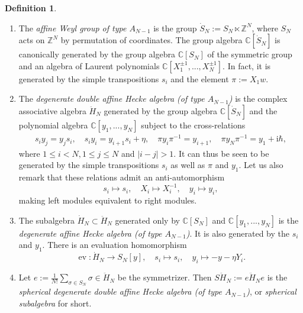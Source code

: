 \documentclass[11pt]{report}
\theoremstyle{definition}
\newtheorem{definition}[theorem]{Definition}
\theoremstyle{remark}
\theoremstyle{remark}
\newcommand{\Z}{\mathbb{Z}}
\newcommand{\C}{\mathbb{C}}
\newcommand{\I}{\mathrm{i}}
\begin{document}
\begin{definition}
\begin{enumerate}[label=(\roman*)]
\item The \emph{affine Weyl group of type $A_{N-1}$} is the group $\dot S_N := S_N \ltimes \Z^N$, where $S_N$ acts on $\Z^N$ by permutation of coordinates. The group algebra $\C[\dot S_N]$ is canonically generated by the group algebra $\C[S_N]$ of the symmetric group and an algebra of Laurent polynomials $\C[X_1^{\pm 1},...,X_N^{\pm 1}]$. In fact, it is generated by the simple transpositions $s_i$ and the element $\pi := X_1 w$.
\item The \emph{degenerate double affine Hecke algebra (of type $A_{N-1}$)} is the complex associative algebra $\ddot H_N$ generated by the group algebra $\C[\dot S_N]$ and the polynomial algebra $\C[y_1,...,y_N]$ subject to the cross-relations
\begin{align*}
s_i y_j = y_j s_i, \quad s_i y_i = y_{i+1} s_i + \eta, \quad \pi y_i \pi^{-1} = y_{i+1}, \quad \pi y_N \pi^{-1} = y_1 + \I \hbar,
\end{align*}
where $1 \leq i < N, 1 \leq j \leq N$ and $|i-j|>1$. It can thus be seen to be generated by the simple transpositions $s_i$ as well as $\pi$ and $y_1$. Let us also remark that these relations admit an anti-automorphism
\begin{equation*}
s_i \mapsto s_i, \quad X_i \mapsto X_i^{-1}, \quad y_i \mapsto y_i,
\end{equation*}
making left modules equivalent to right modules.
\item The subalgebra $\dot H_N \subset \ddot H_N$ generated only by $\C[S_N]$ and $\C[y_1,...,y_N]$ is the \emph{degenerate affine Hecke algebra (of type $A_{N-1}$)}. It is also generated by the $s_i$ and $y_1$. There is an evaluation homomorphism
\begin{equation*}
\operatorname{ev}: \dot H_N \to S_N[y], \quad s_i \mapsto s_i, \quad y_i \mapsto -y - \eta Y_i.
\end{equation*}
\item Let $e := \frac{1}{N!}\sum_{\sigma \in S_N} \sigma \in \ddot H_N$ be the symmetrizer. Then $S\ddot H_N := e \ddot H_N e$ is the \emph{spherical degenerate double affine Hecke algebra (of type $A_{N-1}$)}, or \emph{spherical subalgebra} for short.
\end{enumerate}
\end{definition}
\end{document}
